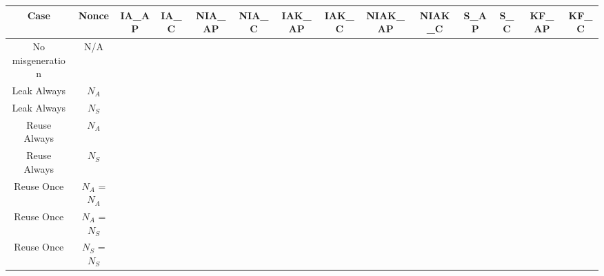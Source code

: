 \documentclass[crop]{standalone}
\newcommand{\noattack}{\color{ForestGreen}\usym{2713}\color{black}}
\newcommand{\attack}{\color{red}\usym{2717}\color{black}}
\begin{document}
\parbox{30cm}{
\begin{tabular}{|c|c|c|c|c|c|c|c|c|c|c|c|c|c|}
\hline
Case & Nonce & IA\_AP & IA\_C & NIA\_AP & NIA\_C & IAK\_AP & IAK\_C & NIAK\_AP & NIAK\_C & S\_AP & S\_C & KF\_AP & KF\_C \\ \hline
No misgeneration & N/A & \noattack & \noattack & \noattack & \noattack & \noattack & \noattack & \noattack & \noattack & \noattack & \noattack & \noattack & \noattack\\ \hline
Leak Always & $N_A$ & \noattack & \noattack & \noattack & \noattack & \noattack & \noattack & \noattack & \noattack & \noattack & \noattack & \noattack & \noattack\\ \hline
Leak Always & $N_S$ & \noattack & \noattack & \noattack & \noattack & \noattack & \noattack & \noattack & \noattack & \noattack & \noattack & \noattack & \noattack\\ \hline
Reuse Always & $N_A$ & \attack & \noattack & \noattack & \noattack & \attack & \noattack & \noattack & \noattack & \noattack & \noattack & \attack & \noattack\\ \hline
Reuse Always & $N_S$ & \noattack & \attack & \noattack & \noattack & \noattack & \attack & \noattack & \noattack & \noattack & \noattack & \noattack & \attack\\ \hline
Reuse Once & $N_A$ = $N_A$ & \attack & \noattack & \noattack & \noattack & \attack & \noattack & \noattack & \noattack & \noattack & \noattack & \attack & \noattack\\ \hline
Reuse Once & $N_A$ = $N_S$ & \noattack & \noattack & \noattack & \noattack & \noattack & \noattack & \noattack & \noattack & \noattack & \noattack & \noattack & \noattack\\ \hline
Reuse Once & $N_S$ = $N_S$ & \noattack & \attack & \noattack & \noattack & \noattack & \attack & \noattack & \noattack & \noattack & \noattack & \noattack & \attack\\ \hline
\end{tabular}}
\end{document}
